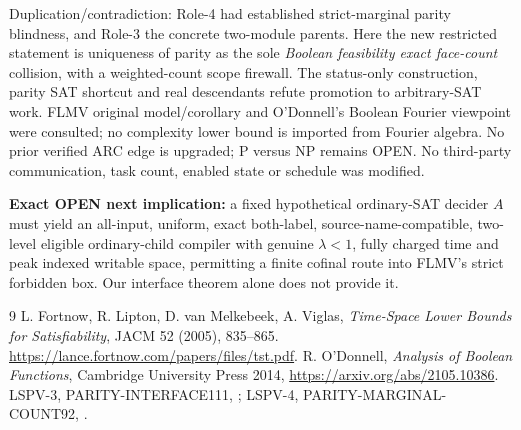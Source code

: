 \documentclass[11pt]{article}
\begin{document}
Duplication/contradiction: Role-4 had established strict-marginal parity blindness, and Role-3 the concrete two-module parents. Here the new restricted statement is uniqueness of parity as the sole \emph{Boolean feasibility exact face-count} collision, with a weighted-count scope firewall. The status-only construction, parity SAT shortcut and real descendants refute promotion to arbitrary-SAT work. FLMV original model/corollary and O'Donnell's Boolean Fourier viewpoint were consulted; no complexity lower bound is imported from Fourier algebra. No prior verified ARC edge is upgraded; P versus NP remains OPEN. No third-party communication, task count, enabled state or schedule was modified.

\textbf{Exact OPEN next implication:} a fixed hypothetical ordinary-SAT decider $A$ must yield an all-input, uniform, exact both-label, source-name-compatible, two-level eligible ordinary-child compiler with genuine $\lambda<1$, fully charged time and peak indexed writable space, permitting a finite cofinal route into FLMV's strict forbidden box. Our interface theorem alone does not provide it.
\begin{thebibliography}{9}
 L. Fortnow, R. Lipton, D. van Melkebeek, A. Viglas, \emph{Time-Space Lower Bounds for Satisfiability}, JACM 52 (2005), 835--865. \url{https://lance.fortnow.com/papers/files/tst.pdf}.
 R. O'Donnell, \emph{Analysis of Boolean Functions}, Cambridge University Press 2014, \url{https://arxiv.org/abs/2105.10386}.
 LSPV-3, PARITY-INTERFACE111, ; LSPV-4, PARITY-MARGINAL-COUNT92, .
\end{thebibliography}
\end{document}
